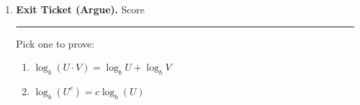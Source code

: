 \documentclass[twoside, 10pt]{article}
\begin{document}
\begin{enumerate}[label=\arabic*.]
\begin{enumerate}
\hrulefill\\[1em]

\hrulefill\\[1em]

\hrulefill\\[1em]

\hrulefill\\[1em]

\hrulefill\\[1em]
\clearpage
\end{enumerate}
\item {\bf Exit Ticket (Argue).} Score \rule{4em}{.4pt}

Pick one to prove:

\begin{enumerate}
\item
$\log_b(U\cdot V) = \log_bU + \log_bV$
\item 
$\log_b(U^c) = c\log_b(U)$
\end{enumerate}
\end{enumerate}
\end{document}
